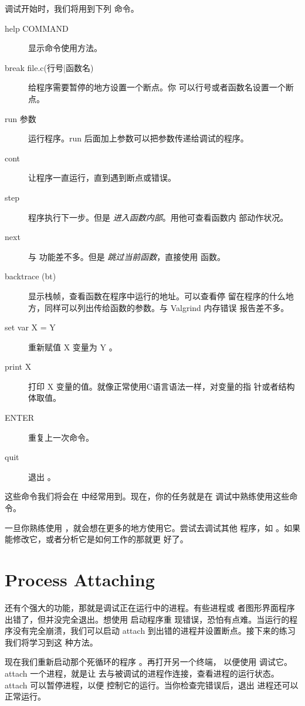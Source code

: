 \begin{enumerate}
调试开始时，我们将用到下列  命令。

\begin{description}
\item[help COMMAND] 显示命令使用方法。
\item[break file.c(行号|函数名)] 给程序需要暂停的地方设置一个断点。你
  可以行号或者函数名设置一个断点。
\item[run 参数] 运行程序。run 后面加上参数可以把参数传递给调试的程序。
\item[cont] 让程序一直运行，直到遇到断点或错误。
\item[step] 程序执行下一步。但是 \emph{进入函数内部}。用他可查看函数内
  部动作状况。
\item[next] 与  功能差不多。但是 \emph{跳过当前函数}，直接使用
  函数。
\item[backtrace (bt)] 显示栈帧，查看函数在程序中运行的地址。可以查看停
  留在程序的什么地方，同样可以列出传给函数的参数。与 Valgrind 内存错误
  报告差不多。
\item[set var X = Y] 重新赋值 X 变量为 Y 。
\item[print X] 打印 X 变量的值。就像正常使用C语言语法一样，对变量的指
  针或者结构体取值。
\item[ENTER] 重复上一次命令。
\item[quit] 退出 。
\end{description}


这些命令我们将会在  中经常用到。现在，你的任务就是在
 调试中熟练使用这些命令。


一旦你熟练使用 ，就会想在更多的地方使用它。尝试去调试其他
程序，如 。如果能修改它，或者分析它是如何工作的那就更
好了。

\section{Process Attaching}

 还有个强大的功能，那就是调试正在运行中的进程。有些进程或
者图形界面程序出错了，但并没完全退出。想使用  启动程序重
现错误，恐怕有点难。当运行的程序没有完全崩溃，我们可以启动
 attach 到出错的进程并设置断点。接下来的练习我们将学习到这
种方法。

现在我们重新启动那个死循环的程序 。再打开另一个终端，
以便使用  调试它。attach 一个进程，就是让 
去与被调试的进程作连接，查看进程的运行状态。attach 可以暂停进程，以便
控制它的运行。当你检查完错误后，退出  进程还可以正常运行。


\end{enumerate}
